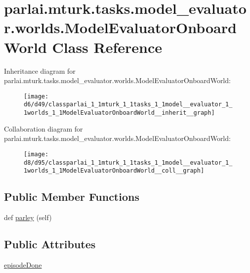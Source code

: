 \hypertarget{classparlai_1_1mturk_1_1tasks_1_1model__evaluator_1_1worlds_1_1ModelEvaluatorOnboardWorld}{}\section{parlai.\+mturk.\+tasks.\+model\+\_\+evaluator.\+worlds.\+Model\+Evaluator\+Onboard\+World Class Reference}
\label{classparlai_1_1mturk_1_1tasks_1_1model__evaluator_1_1worlds_1_1ModelEvaluatorOnboardWorld}


Inheritance diagram for parlai.\+mturk.\+tasks.\+model\+\_\+evaluator.\+worlds.\+Model\+Evaluator\+Onboard\+World\+:\nopagebreak
\begin{figure}[H]
\begin{center}
\leavevmode
\texttt{[image: d6/d49/classparlai\_1\_1mturk\_1\_1tasks\_1\_1model\_\_evaluator\_1\_1worlds\_1\_1ModelEvaluatorOnboardWorld\_\_inherit\_\_graph]}
\end{center}
\end{figure}


Collaboration diagram for parlai.\+mturk.\+tasks.\+model\+\_\+evaluator.\+worlds.\+Model\+Evaluator\+Onboard\+World\+:\nopagebreak
\begin{figure}[H]
\begin{center}
\leavevmode
\texttt{[image: d8/d95/classparlai\_1\_1mturk\_1\_1tasks\_1\_1model\_\_evaluator\_1\_1worlds\_1\_1ModelEvaluatorOnboardWorld\_\_coll\_\_graph]}
\end{center}
\end{figure}
\subsection*{Public Member Functions}
\begin{DoxyCompactItemize}
\item 
def \hyperlink{classparlai_1_1mturk_1_1tasks_1_1model__evaluator_1_1worlds_1_1ModelEvaluatorOnboardWorld_a1ac5cd28dd7c3733b9f0ee491f476363}{parley} (self)
\end{DoxyCompactItemize}
\subsection*{Public Attributes}
\begin{DoxyCompactItemize}
\item 
\hyperlink{classparlai_1_1mturk_1_1tasks_1_1model__evaluator_1_1worlds_1_1ModelEvaluatorOnboardWorld_a24629697aabaa6c6127d6cb0681e9cbd}{episode\+Done}
\end{DoxyCompactItemize}


